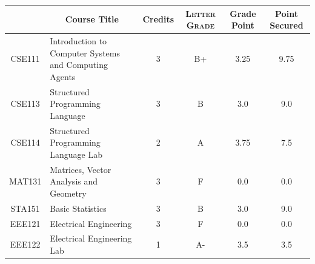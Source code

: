 \documentclass[11pt]{article}
\newcommand*{\numtwo}[1]{\pgfmathprintnumber[
                    fixed, precision=2, fixed zerofill=true]{#1}}
\begin{document}
                \begin{center}
                    \renewcommand{\arraystretch}{1.08}
                    
                \begin{tabular}{|c|l|c|>{\scshape}c|c|c|}
                \hline  \rule[-1ex]{0pt}{3.5ex} {\centering{\bf Course Code}} &  \multicolumn{1}{c|}{\textbf{Course Title}}  & {\bf Credits} & {\bf Letter Grade} & {\bf Grade Point} & {\bf Point Secured}  \\ 
                \hline   CSE111 &  Introduction to Computer Systems and Computing Agents		 & 3 & B+ & 3.25 & 9.75 \\ %
                \hline   CSE113 &  Structured Programming Language		 & 3 & B & 3.0 & 9.0 \\ %
                \hline   CSE114 &  Structured Programming Language Lab		 & 2 & A & 3.75 & 7.5 \\ %
                \hline   MAT131 &  Matrices, Vector Analysis and Geometry		 & 3 & F & 0.0 & 0.0 \\ %
                \hline   STA151 &  Basic Statistics		 & 3 & B & 3.0 & 9.0 \\ %
                \hline   EEE121 &  Electrical Engineering		 & 3 & F & 0.0 & 0.0 \\ %
                \hline   EEE122 &  Electrical Engineering Lab		 & 1 & A- & 3.5 & 3.5 \\ %

\hline                %
                \end{tabular}
                \end{center}
                \renewcommand{\arraystretch}{1.03}
\end{document}

